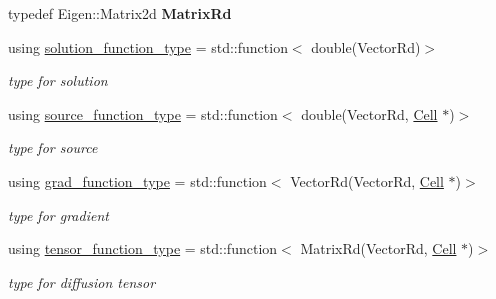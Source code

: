 \begin{DoxyCompactItemize}
\item 
\mbox{\label{classHArDCore2D_1_1HHO__LocVarDiff_a882ad93c38e05d38059c06820c85a375}} 
typedef Eigen\+::\+Matrix2d {\bfseries Matrix\+Rd}
\item 
\mbox{\label{classHArDCore2D_1_1HHO__LocVarDiff_ae1c9d7cb11a0b31461d4c19c3b7a7aab}} 
using \hyperlink{classHArDCore2D_1_1HHO__LocVarDiff_ae1c9d7cb11a0b31461d4c19c3b7a7aab}{solution\+\_\+function\+\_\+type} = std\+::function$<$ double(Vector\+Rd)$>$
\begin{DoxyCompactList}\small\item\em type for solution \end{DoxyCompactList}\item 
\mbox{\label{classHArDCore2D_1_1HHO__LocVarDiff_a5a85ff6ce87c2247d4a4af57b070320d}} 
using \hyperlink{classHArDCore2D_1_1HHO__LocVarDiff_a5a85ff6ce87c2247d4a4af57b070320d}{source\+\_\+function\+\_\+type} = std\+::function$<$ double(Vector\+Rd, \hyperlink{classHArDCore2D_1_1Cell}{Cell} $\ast$)$>$
\begin{DoxyCompactList}\small\item\em type for source \end{DoxyCompactList}\item 
\mbox{\label{classHArDCore2D_1_1HHO__LocVarDiff_ae0ce0c1a88fe08ddd972cbed5a9e4837}} 
using \hyperlink{classHArDCore2D_1_1HHO__LocVarDiff_ae0ce0c1a88fe08ddd972cbed5a9e4837}{grad\+\_\+function\+\_\+type} = std\+::function$<$ Vector\+Rd(Vector\+Rd, \hyperlink{classHArDCore2D_1_1Cell}{Cell} $\ast$)$>$
\begin{DoxyCompactList}\small\item\em type for gradient \end{DoxyCompactList}\item 
\mbox{\label{classHArDCore2D_1_1HHO__LocVarDiff_ab9add9590d4d5b4193799e917c8d746b}} 
using \hyperlink{classHArDCore2D_1_1HHO__LocVarDiff_ab9add9590d4d5b4193799e917c8d746b}{tensor\+\_\+function\+\_\+type} = std\+::function$<$ Matrix\+Rd(Vector\+Rd, \hyperlink{classHArDCore2D_1_1Cell}{Cell} $\ast$)$>$
\begin{DoxyCompactList}\small\item\em type for diffusion tensor \end{DoxyCompactList}\end{DoxyCompactItemize}

